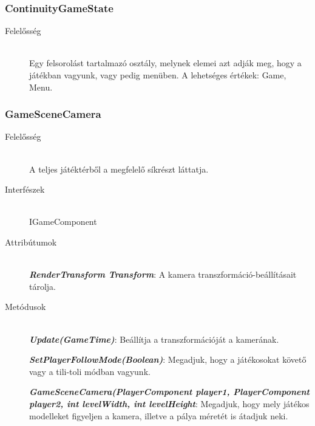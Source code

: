 \subsubsection{ContinuityGameState}
	\begin{description}
		\item[Felelősség] \hfill \\
		Egy felsorolást tartalmazó osztály, melynek elemei azt adják meg, hogy a játékban vagyunk, vagy pedig menüben. A lehetséges értékek: Game, Menu.
	\end{description}
	

\subsubsection{GameSceneCamera}
	\begin{description}
		\item[Felelősség] \hfill \\
		A teljes játéktérből a megfelelő síkrészt láttatja.
		\item[Interfészek] \hfill \\
		IGameComponent
		\item[Attribútumok] \hfill \\
		\textbf{\emph{RenderTransform Transform}}: A kamera transzformáció-beállításait tárolja.

		\item[Metódusok] \hfill \\
		\textbf{\emph{Update(GameTime)}}: Beállítja a transzformációját a kamerának.

		\textbf{\emph{SetPlayerFollowMode(Boolean)}}: Megadjuk, hogy a játékosokat követő vagy a tili-toli módban vagyunk.
		
		\textbf{\emph{GameSceneCamera(PlayerComponent player1, PlayerComponent player2, int levelWidth, int levelHeight}}: Megadjuk, hogy mely játékos modelleket figyeljen a kamera, illetve a pálya méretét is átadjuk neki.
	\end{description}

